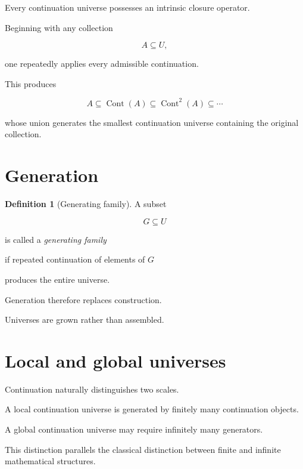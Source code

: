 \documentclass[13pt,openany]{book}
\theoremstyle{plain}
\theoremstyle{definition}
\newtheorem{definition}{Definition}[chapter]
\begin{document}
Every continuation universe possesses an intrinsic closure operator.

Beginning with any collection

\[
A\subseteq U,
\]

one repeatedly applies every admissible continuation.

This produces

\[
A
\subseteq
\operatorname{Cont}(A)
\subseteq
\operatorname{Cont}^2(A)
\subseteq
\cdots
\]

whose union generates the smallest continuation universe containing the original collection.


\section{Generation}

\begin{definition}[Generating family]

A subset

\[
G\subseteq U
\]

is called a
\emph{generating family}

if repeated continuation of elements of $G$

produces the entire universe.

\end{definition}

Generation therefore replaces construction.

Universes are grown rather than assembled.


\section{Local and global universes}

Continuation naturally distinguishes two scales.

A local continuation universe is generated by finitely many continuation objects.

A global continuation universe may require infinitely many generators.

This distinction parallels the classical distinction between finite and infinite mathematical structures.

\end{document}
